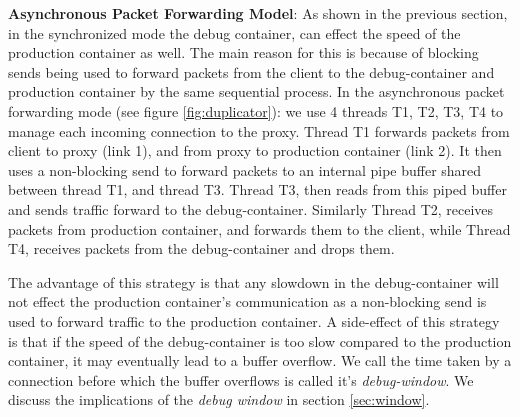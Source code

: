 \noindent
\textbf{Asynchronous Packet Forwarding Model}: 
As shown in the previous section, in the synchronized mode the debug container, can effect the speed of the production container as well. 
The main reason for this is because of blocking sends being used to forward packets from the client to the debug-container and production container by the same sequential process.
In the asynchronous packet forwarding mode (see figure \ref{fig:duplicator}): we use 4 threads T1, T2, T3, T4 to manage each incoming connection to the proxy.
Thread T1 forwards packets from client to proxy (link 1), and from proxy to production container (link 2). 
It then uses a non-blocking send to forward packets to an internal pipe buffer shared between thread T1, and thread T3. 
Thread T3, then reads from this piped buffer and sends traffic forward to the debug-container. 
Similarly Thread T2, receives packets from production container, and forwards them to the client, while Thread T4, receives packets from the debug-container and drops them.

The advantage of this strategy is that any slowdown in the debug-container will not effect the production container's communication as a non-blocking send is used to forward traffic to the production container. 
A side-effect of this strategy is that if the speed of the debug-container is too slow compared to the production container, it may eventually lead to a buffer overflow. 
We call the time taken by a connection before which the buffer overflows is called it's \emph{debug-window}.
We discuss the implications of the \emph{debug window} in section \ref{sec:window}.  


